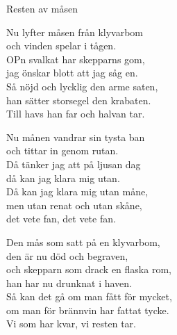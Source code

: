\begin{song}{Resten av måsen}
	

	
	
	Nu lyfter måsen från klyvarbom\\
	och vinden spelar i tågen.\\
	OPn svalkat har skepparns gom,\\
	jag önskar blott att jag såg en.\\
	Så nöjd och lycklig den arme saten,\\
	han sätter storsegel den krabaten.\\
	Till havs han far och halvan tar.

	Nu månen vandrar sin tysta ban\\
	och tittar in genom rutan.\\
	Då tänker jag att på ljusan dag\\
	då kan jag klara mig utan.\\
	Då kan jag klara mig utan måne,\\
	men utan renat och utan skåne,\\
	det vete fan, det vete fan.

	Den mås som satt på en klyvarbom,\\
	den är nu död och begraven,\\
	och skepparn som drack en flaska rom,\\
	han har nu drunknat i haven.\\
	Så kan det gå om man fått för mycket,\\
	om man för brännvin har fattat tycke.\\
	Vi som har kvar, vi resten tar.
	
\end{song}
